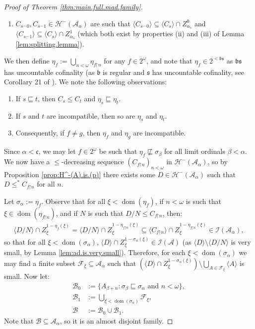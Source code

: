 \documentclass[10pt,a4paper]{amsart}
\theoremstyle{plain}
\numberwithin{equation}{section}
\theoremstyle{definition}
\newcommand{\func}{\operatorname}
\renewcommand{\c}[1]{\langle #1 \rangle}
\newcommand{\bb}[1]{\left( #1 \right)}
\newcommand{\F}{\cal{F}}
\newcommand{\cal}{\mathcal}
\renewcommand{\frak}{\mathfrak}
\newcommand{\dom}{\func{dom}}
\newcommand{\A}{\cal{A}}
\newcommand{\B}{\cal{B}}
\newcommand{\restrictedto}{\mathord{\upharpoonright}}
\renewcommand{\H}{\cal{H}}
\newcommand{\I}{\cal{I}}
\begin{document}
\begin{proof}[Proof of Theorem \ref{thm:main.full.mad.family}]
\begin{enumerate}
        \item $C_{s^\frown0},C_{s^\frown1} \in \H^-(\A_\alpha)$ are such that $\c{C_{s^\frown0}} \subseteq \c{C_s} \cap Z_{\alpha_s}^0$ and $\c{C_{s^\frown1}} \subseteq \c{C_s} \cap Z_{\alpha_s}^1$ (which both exist by properties (ii) and (iii) of Lemma \ref{lem:splitting.lemma}).
    \end{enumerate}
    We then define $\eta_f := \bigcup_{n<\omega} \eta_{f\restrictedto n}$ for any $f \in 2^\omega$, and note that $\eta_f \in 2^{<\frak{bs}}$ as $\frak{bs}$ has uncountable cofinality (as $\frak{b}$ is regular and $\frak{s}$ has uncountable cofinality, see Corollary 21 of \cite{G21}). We note the following observations:
    \begin{enumerate}
        \item If $s \sqsubseteq t$, then $C_s \leq C_t$ and $\eta_s \sqsubseteq \eta_t$.

        \item If $s$ and $t$ are incompatible, then so are $\eta_s$ and $\eta_t$.

        \item Consequently, if $f \neq g$, then $\eta_f$ and $\eta_g$ are incompatible.
    \end{enumerate}
    Since $\alpha < \frak{c}$, we may let $f \in 2^\omega$ be such that $\eta_f \not\sqsubseteq \sigma_\beta$ for all limit ordinals $\beta < \alpha$. We now have a $\leq$-decreasing sequence $(C_{f\restrictedto n})_{n<\omega}$ in $\H^-(\A_\alpha)$, so by Proposition \ref{prop:H^-(A).is.(p)} there exists some $D \in \H^-(\A_\alpha)$ such that $D \leq^* C_{f\restrictedto n}$ for all $n$.

    Let $\sigma_{\alpha} := \eta_f$. Observe that for all $\xi < \dom(\eta_f)$, if $n < \omega$ is such that $\xi \in \dom(\eta_{f\restrictedto n})$, and if $N$ is such that $D/N \leq C_{f\restrictedto n}$, then:
    \begin{align*}
        \c{D/N} \cap Z_\xi^{1-\eta_f(\xi)} = \c{D/N} \cap Z_\xi^{1-\eta_{f\restrictedto n}(\xi)} \subseteq \c{C_{f\restrictedto n}} \cap Z_\xi^{1-\eta_{f\restrictedto n}(\xi)} \in \I(\A_\alpha),
    \end{align*}
    so that for all $\xi < \dom(\sigma_{\alpha})$, $\c{D} \cap Z_\xi^{1-\sigma_\alpha(\xi)} \in \I(\A)$ (as $\c{D} \setminus \c{D/N}$ is very small, by Lemma \ref{lem:ad.is.very.small}). Therefore, for each $\xi < \dom(\sigma_\alpha)$ we may find a finite subset $\F_\xi \subseteq \A_\alpha$ such that $\bb{\c{D} \cap Z_\xi^{1-\sigma_\alpha(\xi)}} \setminus \bigcup_{A \in \F_\xi} \c{A}$ is small. Now let:
    \begin{align*}
        \B_0 &:= \{A_{\beta+n} : \sigma_\beta \sqsubseteq \sigma_\alpha \text{ and } n < \omega\}, \\
        \B_1 &:= \bigcup_{\xi < \dom(\sigma_\alpha)} \F_\xi, \\
        \B &:= \B_0 \cup \B_1.
    \end{align*}
    Note that $\B \subseteq \A_\alpha$, so it is an almost disjoint family.


\end{proof}
\end{document}
